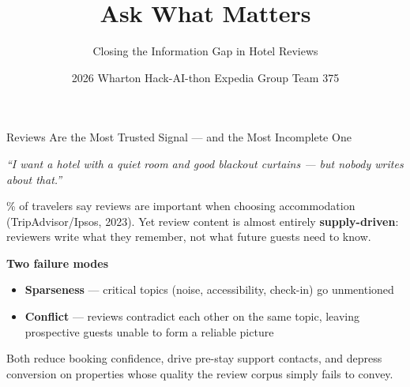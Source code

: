 \documentclass[aspectratio=169,10pt]{beamer}
\title{\textbf{Ask What Matters}}
\subtitle{Closing the Information Gap in Hotel Reviews}
\author{2026 Wharton Hack-AI-thon \textbar{} Expedia Group \textbar{} Team 375}
\date{}
\newcommand{\shead}[1]{\smallskip\textbf{#1}\par\smallskip}
\begin{document}

\begin{frame}
\titlepage
\end{frame}

\begin{frame}{Reviews Are the Most Trusted Signal --- and the Most Incomplete One}

\textit{``I want a hotel with a quiet room and good blackout curtains --- but nobody writes about that.''}

\% of travelers say reviews are important when choosing accommodation (TripAdvisor/Ipsos, 2023).
Yet review content is almost entirely \textbf{supply-driven}:
reviewers write what they remember, not what future guests need to know.

\medskip
\shead{Two failure modes}
\begin{itemize}
  \item \textbf{Sparseness} --- critical topics (noise, accessibility, check-in) go unmentioned
  \item \textbf{Conflict} --- reviews contradict each other on the same topic, leaving prospective guests unable to form a reliable picture
\end{itemize}

\medskip
Both reduce booking confidence, drive pre-stay support contacts, and depress conversion on
properties whose quality the review corpus simply fails to convey.

\end{frame}
\end{document}
